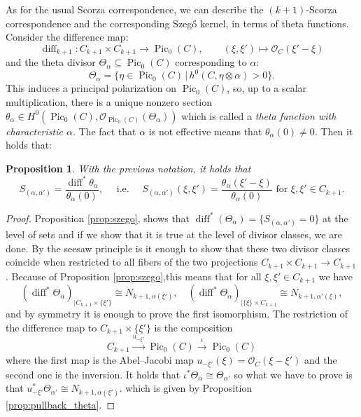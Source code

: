 \documentclass[12pt]{amsart}
\newcounter{thmcounter}
\numberwithin{equation}{section}
\numberwithin{thmcounter}{section}
\newtheorem{proposition}[thmcounter]{Proposition}
\theoremstyle{definition}
\theoremstyle{claim}
\newcommand{\sO}{\mathscr{O}}
\DeclareMathOperator{\Pic}{Pic}
\begin{document}
As for the usual Scorza correspondence, we can describe the $(k+1)$-Scorza correspondence and the corresponding Szeg\H{o} kernel, in terms of theta functions.
Consider the difference map:
\[ \operatorname{diff}_{k+1}\colon C_{k+1} \times C_{k+1} \longrightarrow \operatorname{Pic}_0(C), \qquad (\xi,\xi') \longmapsto \sO_C(\xi'-\xi) \]
and the theta divisor  $\Theta_{\alpha} \subseteq \Pic_0(C)$ corresponding to $\alpha$:
\[ \Theta_{\alpha} = \{ \eta \in \Pic_0(C) \,|\, h^0(C,\eta\otimes \alpha) > 0\} .\]
This induces a principal polarization on $\Pic_0(C)$, so, up to a scalar multiplication, there is a unique nonzero section $\theta_{\alpha} \in H^0(\Pic_0(C),\sO_{\Pic_0(C)}(\Theta_{\alpha}))$ which is called a \emph{theta function with characteristic $\alpha$}. The fact that $\alpha$ is not effective means that $\theta_{\alpha}(0)\ne 0$. Then it holds that:

\begin{proposition}\label{prop:szego_theta}
	With the previous notation, it holds that
	\[ S_{(\alpha,\alpha')} = \frac{\operatorname{diff}^*\theta_{\alpha}}{\theta_{\alpha}(0)}, \quad \text{ i.e. } \quad S_{(\alpha,\alpha')}(\xi,\xi') = \frac{\theta_{\alpha}(\xi'-\xi)}{\theta_{\alpha}(0)} \text{ for } \xi,\xi' \in C_{k+1}.   \] 
\end{proposition}
\begin{proof}
	Proposition \ref{prop:szego}, shows that $\operatorname{diff}^*(\Theta_{\alpha}) = \{ S_{(\alpha,\alpha')} = 0\}$ at the level of sets and if we show that it is true at the level of divisor classes, we are done. By the seesaw principle is it enough to show that these two divisor classes coincide when restricted to all fibers of the two projections $C_{k+1}\times C_{k+1} \to C_{k+1}$. Because of Proposition \ref{prop:szego},this means that for all $\xi,\xi'\in C_{k+1}$ we have
	\[ (\operatorname{diff}^*\Theta_\alpha)_{|C_{k+1}\times \{\xi'\}} \cong N_{k+1,\alpha(\xi')}, \quad (\operatorname{diff}^*\Theta_\alpha)_{|\{\xi\}\times C_{k+1}} \cong N_{k+1,\alpha'(\xi)} ,\] 
	and by symmetry it is enough to prove the first isomorphism. The restriction of the difference map to $C_{k+1}\times\{\xi'\}$ is the composition 
	\[ C_{k+1} \overset{u_{-\xi'}}{\longrightarrow}  \operatorname{Pic}_0(C) \overset{\iota}{\longrightarrow} \operatorname{Pic}_0(C)  \]
	where the first map is the Abel--Jacobi map $u_{-\xi'}(\xi)=\sO_C(\xi-\xi')$ and the second one is the inversion. It holds that $\iota^*\Theta_{\alpha}\cong \Theta_{\alpha'}$ so what we have to prove is that $u_{-\xi'}^*\Theta_{\alpha'} \cong N_{k+1,\alpha(\xi')}$. which is given by Proposition \ref{prop:pullback_theta}. 
\end{proof}
\end{document}
